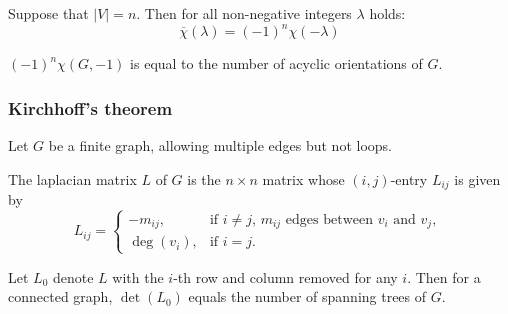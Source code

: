 \begin{theorem}
    Suppose that $|V| = n$. Then for all non-negative integers $\lambda$ holds:
    $$\overline{\chi}(\lambda) = (-1)^n \chi(-\lambda)$$
\end{theorem}

\begin{corollary}
    $(-1)^n \chi(G, -1)$ is equal to the number of acyclic orientations of $G$.
\end{corollary}

\subsubsection*{Kirchhoff's theorem}

Let $G$ be a finite graph, allowing multiple edges but not loops.

The laplacian matrix $L$ of $G$ is the $n \times n$ matrix whose
$(i, j)$-entry $L_{i j}$ is given by
\begin{displaymath}
L_{i j} = \left\{ \begin{array}{ll}
-m_{i j}, & \textrm{if $i \ne j$, $m_{i j}$ edges between $v_i$ and $v_j$, } \\
\deg(v_i), & \textrm{if $i = j$.}
\end{array} \right.
\end{displaymath}

Let $L_0$ denote $L$ with the $i$-th row and column removed for any $i$.
Then for a connected graph, $\det(L_0)$ equals the number of spanning trees of $G$.
